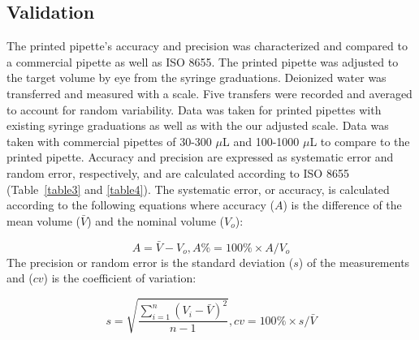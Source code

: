 \documentclass[10pt,letterpaper]{article}
\begin{document}
\subsection*{Validation}
The printed pipette’s accuracy and precision was characterized and compared to a commercial pipette as well as ISO 8655.
The printed pipette was adjusted to the target volume by eye from the syringe graduations.
Deionized water was transferred and measured with a scale.
Five transfers were recorded and averaged to account for random variability.
Data was taken for printed pipettes with existing syringe graduations as well as with the our adjusted scale.
Data was taken with commercial pipettes of 30-300 $\mu$L and 100-1000 $\mu$L to compare to the printed pipette.
Accuracy and precision are expressed as systematic error and random error, respectively, and are calculated according to ISO 8655~\cite{ISO8655} (Table~\ref{table3} and \ref{table4}).
The systematic error, or accuracy, is calculated according to the following equations where accuracy ($A$) is the difference of the mean volume ($\bar{V}$) and the nominal volume ($V_{o}$):

\begin{equation}\label{eq:accuracy} 
A = \bar{V}-V_{o},
A\% = 100\%  \times  A / V_{o}
\end{equation}
The precision or random error is the standard deviation ($s$) of the measurements and ($cv$) is the coefficient of variation:

\begin{equation}\label{eq:precision} 
s = \sqrt{\frac{\sum_{i=1}^{n}(V_{i}-\bar{V})^2}{n-1}},
cv = 100\% \times s / \bar{V}
\end{equation}
\end{document}
